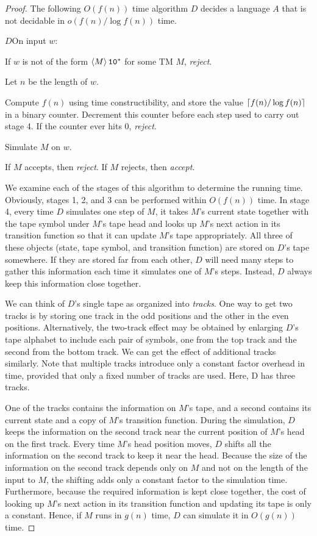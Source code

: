 \begin{proof}
  The following $O(f(n))$ time algorithm $D$ decides a language $A$ that is not decidable in $o(f(n) / \log f(n))$ time.

  \begin{turing}{$D$}{On input $w$:}
  \item If $w$ is not of the form $\left< M \right>\texttt{1}\texttt{0}^\ast$ for some TM $M$, \emph{reject}.
  \item Let $n$ be the length of $w$.
  \item Compute $f(n)$ using time constructibility, and store the value $\lceil f(n) / \log f(n) \rceil$ in a binary counter. Decrement this counter before each step used to carry out stage 4. If the counter ever hits 0, \emph{reject}.
  \item Simulate $M$ on $w$.
  \item If $M$ accepts, then \emph{reject}. If $M$ rejects, then \emph{accept}.
  \end{turing}

  We examine each of the stages of this algorithm to determine the running time. Obviously, stages 1, 2, and 3 can be performed within $O(f(n))$ time. In stage 4, every time $D$ simulates one step of $M$, it takes $M$'s current state together with the tape symbol under $M$'s tape head and looks up $M$'s next action in its transition function so that it can update $M$'s tape appropriately. All three of these objects (state, tape symbol, and transition function) are stored on $D$'s tape somewhere. If they are stored far from each other, $D$ will need many steps to gather this information each time it simulates one of $M$'s steps. Instead, $D$ always keep this information close together.

  We can think of $D$'s single tape as organized into \emph{tracks}. One way to get two tracks is by storing one track in the odd positions and the other in the even positions. Alternatively, the two-track effect may be obtained by enlarging $D$'s tape alphabet to include each pair of symbols, one from the top track and the second from the bottom track. We can get the effect of additional tracks similarly. Note that multiple tracks introduce only a constant factor overhead in time, provided that only a fixed number of tracks are used. Here, D has three tracks.

  One of the tracks contains the information on $M$'s tape, and a second contains its current state and a copy of $M$'s transition function. During the simulation, $D$ keeps the information on the second track near the current position of $M$'s head on the first track. Every time $M$'s head position moves, $D$ shifts all the information on the second track to keep it near the head. Because the size of the information on the second track depends only on $M$ and not on the length of the input to $M$, the shifting adds only a constant factor to the simulation time. Furthermore, because the required information is kept close together, the cost of looking up $M$'s next action in its transition function and updating its tape is only a constant. Hence, if $M$ runs in $g(n)$ time, $D$ can simulate it in $O(g(n))$ time.


\end{proof}
